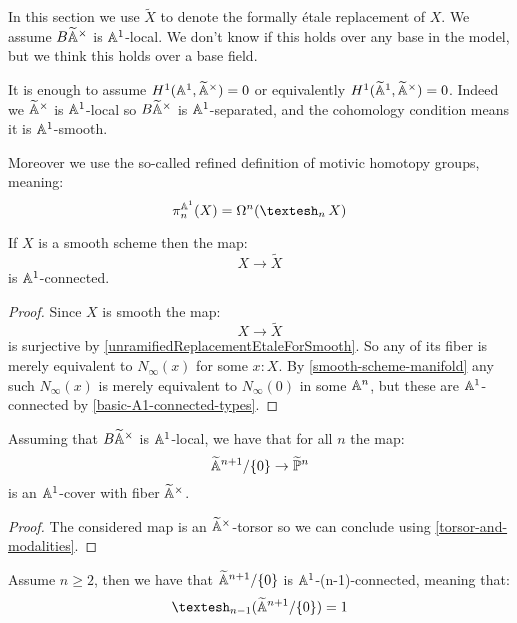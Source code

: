 In this section we use $\widetilde{X}$ to denote the formally étale replacement of $X$. We assume $B\widetilde{\mathbb{A}}^\times$ is $\mathbb{A}^1$-local. We don't know if this holds over any base in the model, but we think this holds over a base field. 

\begin{remark}
It is enough to assume $H^1(\mathbb{A}^1,\widetilde{\mathbb{A}}^\times) = 0$ or equivalently $H^1(\widetilde{\mathbb{A}}^1,\widetilde{\mathbb{A}}^\times)=0$. Indeed we $\widetilde{\mathbb{A}}^\times$ is $\mathbb{A}^1$-local so $B\widetilde{\mathbb{A}}^\times$ is $\mathbb{A}^1$-separated, and the cohomology condition means it is $\mathbb{A}^1$-smooth.
\end{remark}

Moreover we use the so-called refined definition of motivic homotopy groups, meaning:
\[\pi_n^{\A^1}(X) = \Omega^n(\shape_nX)\]

\begin{lemma}\label{smooth-A1-equivalent-etale-replacement}
If $X$ is a smooth scheme then the map:
\[X\to \widetilde X\]
is $\mathbb{A}^1$-connected.
\end{lemma}

\begin{proof}
Since $X$ is smooth the map:
\[X\to \widetilde X\]
is surjective by \cref{unramifiedReplacementEtaleForSmooth}. So any of its fiber is merely equivalent to $N_\infty(x)$ for some $x:X$. By \cref{smooth-scheme-manifold} any such $N_\infty(x)$ is merely equivalent to $N_\infty(0)$ in some $\mathbb{A}^n$, but these are $\mathbb{A}^1$-connected by \cref{basic-A1-connected-types}.
\end{proof}

\begin{lemma}\label{A1-cover-projective}
Assuming that $B\widetilde{\mathbb{A}}^\times$ is $\mathbb{A}^1$-local, we have that for all $n$ the map:
\[\widetilde {\mathbb{A}}^{n+1}/\{0\} \to \widetilde{\mathbb{P}}^n\]
is an $\mathbb{A}^1$-cover with fiber $\widetilde{\mathbb{A}}^\times$.
\end{lemma}

\begin{proof}
The considered map is an $\widetilde{\mathbb{A}}^\times$-torsor so we can conclude using \cref{torsor-and-modalities}.
\end{proof}

\begin{lemma}\label{punctured-space-connected}
Assume $n\geq 2$, then we have that $\widetilde {\mathbb{A}}^{n+1}/\{0\}$ is $\mathbb{A}^1$-(n-1)-connected, meaning that:
\[\shape_{n-1}(\widetilde \A^{n+1}/\{0\}) = 1\]
\end{lemma}

